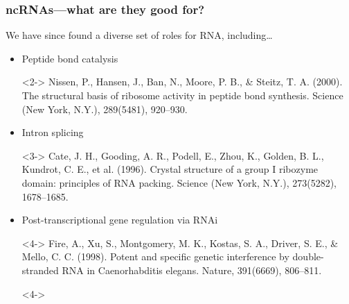 \documentclass{beamer}
\begin{document}
\begin{frame}
  \frametitle{ncRNAs---what are they good for?}

  We have since found a diverse set of roles for RNA, including\dots
  \pause
  \begin{itemize}
  \item<2-> Peptide bond catalysis
  \item[]<2-> \scriptsize Nissen, P., Hansen, J., Ban, N., Moore, P. B., \& Steitz, T. A. (2000). The structural basis of ribosome activity in peptide bond synthesis. Science (New York, N.Y.), 289(5481), 920--930.
  \item<3-> Intron splicing
  \item[]<3-> \scriptsize Cate, J. H., Gooding, A. R., Podell, E., Zhou, K., Golden, B. L., Kundrot, C. E., et al. (1996). Crystal structure of a group I ribozyme domain: principles of RNA packing. Science (New York, N.Y.), 273(5282), 1678--1685.
  \item<4-> Post-transcriptional gene regulation via RNAi
  \item[]<4-> \scriptsize Fire, A., Xu, S., Montgomery, M. K., Kostas, S. A., Driver, S. E., \& Mello, C. C. (1998). Potent and specific genetic interference by double-stranded RNA in Caenorhabditis elegans. Nature, 391(6669), 806--811.
  \item[]<4->
  \end{itemize}
\end{frame}
\end{document}
